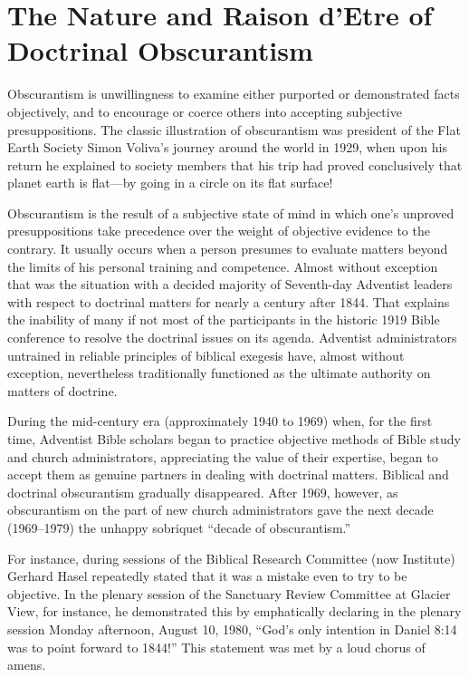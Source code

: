 \section{The Nature and Raison d'Etre of Doctrinal Obscurantism}

Obscurantism is unwillingness to examine either purported or demonstrated
facts objectively, and to encourage or coerce others into accepting
subjective presuppositions. The classic illustration of obscurantism was
president of the Flat Earth Society Simon Voliva's journey around the world
in 1929, when upon his return he explained to society members that his trip
had proved conclusively that planet earth is flat---by going in a circle on
its flat surface!

Obscurantism is the result of a subjective state of mind in which one's
unproved presuppositions take precedence over the weight of objective
evidence to the contrary. It usually occurs when a person presumes to evaluate
matters beyond the limits of his personal training and competence.
Almost without exception that was the situation with a decided majority
of Seventh-day Adventist leaders with respect to doctrinal matters for nearly
a century after 1844. That explains the inability of many if not most of the
participants in the historic 1919 Bible conference to resolve the doctrinal
issues on its agenda. Adventist administrators untrained in reliable principles of
biblical exegesis have, almost without exception, nevertheless traditionally
functioned as the ultimate authority on matters of doctrine.

During the mid-century era (approximately 1940 to 1969) when, for the first
time, Adventist Bible scholars began to practice objective methods of Bible
study and church administrators, appreciating the value of their expertise,
began to accept them as genuine partners in dealing with doctrinal matters.
Biblical and doctrinal obscurantism gradually disappeared. After 1969,
however, as obscurantism on the part of new church administrators gave the
next decade (1969--1979) the unhappy sobriquet ``decade of obscurantism.''

For instance, during sessions of the Biblical Research Committee (now
Institute) Gerhard Hasel repeatedly stated that it was a mistake even to try
to be objective. In the plenary session of the Sanctuary Review Committee at
Glacier View, for instance, he demonstrated this by emphatically declaring
in the plenary session Monday afternoon, August 10, 1980, ``God's only
intention in Daniel 8:14 was to point forward to 1844!'' This statement was
met by a loud chorus of amens.

